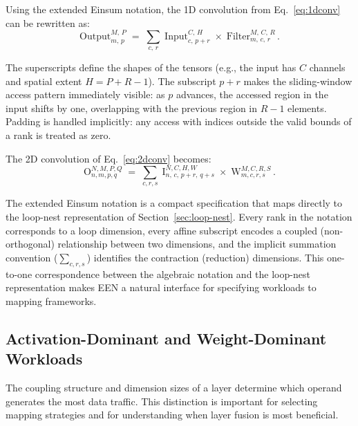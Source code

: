Using the extended Einsum notation, the 1D convolution from
Eq.~\eqref{eq:1dconv} can be rewritten as:
\begin{equation}
\label{eq:een-1dconv}
\mathrm{Output}^{M,\,P}_{m,\,p}
  \;=\; \sum_{c,\,r}\;
  \mathrm{Input}^{C,\,H}_{c,\,p+r} \;\times\;
  \mathrm{Filter}^{M,\,C,\,R}_{m,\,c,\,r}\,.
\end{equation}

\noindent
The superscripts define the shapes of the tensors (e.g., the input has
$C$ channels and spatial extent $H = P + R - 1$).
The subscript $p + r$ makes the sliding-window access pattern
immediately visible: as $p$ advances, the accessed region in the input
shifts by one, overlapping with the previous region in $R - 1$ elements.
Padding is handled implicitly: any access with indices outside the
valid bounds of a rank is treated as zero.

The 2D convolution of Eq.~\eqref{eq:2dconv} becomes:
\begin{equation}
\label{eq:een-2dconv}
\mathrm{O}^{N,M,P,Q}_{n,m,p,q}
  \;=\; \sum_{c,r,s}\;
  \mathrm{I}^{N,C,H,W}_{n,\,c,\,p+r,\,q+s} \;\times\;
  \mathrm{W}^{M,C,R,S}_{m,c,r,s}\,.
\end{equation}

\noindent
The extended Einsum notation is a compact specification that maps
directly to the loop-nest representation of
Section~\ref{sec:loop-nest}.
Every rank in the notation corresponds to a loop dimension, every affine
subscript encodes a coupled (non-orthogonal) relationship between two
dimensions, and the implicit summation convention ($\sum_{c,r,s}$)
identifies the contraction (reduction) dimensions.
This one-to-one correspondence between the algebraic notation and the
loop-nest representation makes EEN a natural interface for specifying
workloads to mapping frameworks.


\subsection{Activation-Dominant and Weight-Dominant Workloads}
\label{sec:act-weight-dominant}

The coupling structure and dimension sizes of a layer determine which
operand generates the most data traffic.
This distinction is important for selecting mapping strategies and
for understanding when layer fusion is most beneficial.

